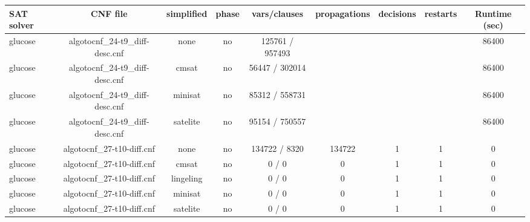 \begin{appendices}
\begin{table}[p]
  \begin{center}
    \begin{tabular}{l|cccccccc}
        \textbf{SAT solver} & \textbf{CNF file} & \textbf{simplified} & \textbf{phase} & \textbf{vars/clauses} & \textbf{propagations} & \textbf{decisions} & \textbf{restarts} & \textbf{Runtime (sec)} \\
      \hline
  glucose                        & algotocnf\_24-t9\_diff-desc.cnf & none       & no    & 125761 / 957493 &           &           &            & 86400 \\ %
  glucose                        & algotocnf\_24-t9\_diff-desc.cnf & cmsat      & no    & 56447 / 302014 &           &           &            & 86400 \\ %
  glucose                        & algotocnf\_24-t9\_diff-desc.cnf & minisat    & no    & 85312 / 558731 &           &           &            & 86400 \\ %
  glucose                        & algotocnf\_24-t9\_diff-desc.cnf & satelite   & no    & 95154 / 750557 &           &           &            & 86400 \\ %
  glucose                        & algotocnf\_27-t10-diff.cnf     & none       & no    & 134722 / 8320 & 134722    & 1         & 1          & 0 \\ %
  glucose                        & algotocnf\_27-t10-diff.cnf     & cmsat      & no    & 0 / 0      & 0         & 1         & 1          & 0 \\ %
  glucose                        & algotocnf\_27-t10-diff.cnf     & lingeling  & no    & 0 / 0      & 0         & 1         & 1          & 0 \\ %
  glucose                        & algotocnf\_27-t10-diff.cnf     & minisat    & no    & 0 / 0      & 0         & 1         & 1          & 0 \\ %
  glucose                        & algotocnf\_27-t10-diff.cnf     & satelite   & no    & 0 / 0      & 0         & 1         & 1          & 0 \\ %

\end{tabular}
\end{center}
\end{table}
\end{appendices}
